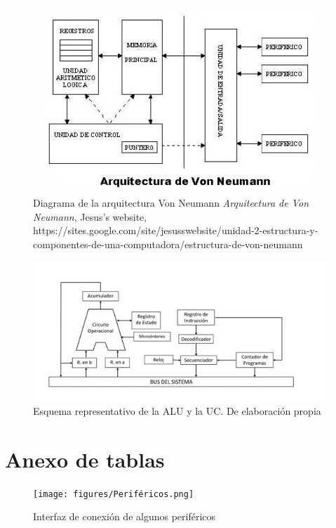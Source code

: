 \documentclass{book}
\begin{document}
\begin{figure}[H]
    \centering
    \includegraphics[width=1\textwidth]{figures/Von_Neumann.png}
    \caption{ \Centering Diagrama  de la arquitectura Von Neumann\newline
    \textit{Arquitectura de Von Neumann}, Jesus's website, https://sites.google.com/site/jesusswebsite/unidad-2-estructura-y-componentes-de-una-computadora/estructura-de-von-neumann} 
    \label{fig:arq_vn}
\end{figure}


\begin{figure}[H]
    \centering
    \includegraphics[width=1\textwidth]{figures/ALU .jpg}
    \caption{ Esquema representativo de la ALU y la UC.\newline
    De elaboración propia}
    \label{fig:arq_vn}
\end{figure}


\chapter{Anexo de tablas}

\begin{figure}[H]
    \centering
    \texttt{[image: figures/Periféricos.png]}
    \caption{ Interfaz de conexión de algunos periféricos }
    \label{fig:arq_vn}
\end{figure}
\end{document}
